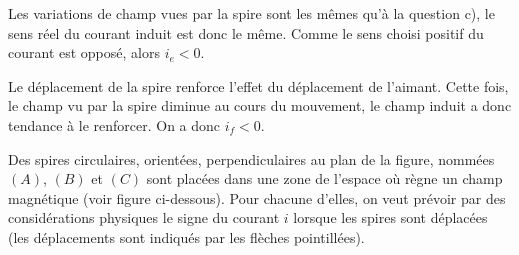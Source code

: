 \begin{enonce}
\end{enonce}
\begin{corrige}
Les variations de champ vues par la spire sont les mêmes qu'à la question c), le sens réel du courant induit est donc
le même.  Comme le sens choisi positif du courant est opposé, alors $i_e < 0$.
\end{corrige}

\begin{enonce}
\end{enonce}
\begin{corrige}
Le déplacement de la spire renforce l'effet du déplacement de l'aimant. Cette fois, le champ vu par la spire diminue
au cours du mouvement, le champ induit a donc tendance à le renforcer. On a donc $i_f < 0$.
\end{corrige}



\finEntrainement















\newpage





\hauteurLargeurCadreReponse		{8mm}{6cm}
\typeEntrainement				{} %
\initialisationEntrainement



Des spires circulaires, orientées, perpendiculaires au plan de la figure,
nommées  $(A)$, $(B)$ et $(C)$ sont placées dans une zone de l'espace où règne un champ magnétique (voir figure ci-dessous). Pour chacune d'elles, on veut prévoir par des considérations
physiques le signe du courant $i$ lorsque les
spires sont déplacées (les déplacements sont indiqués par les flèches
pointillées).

